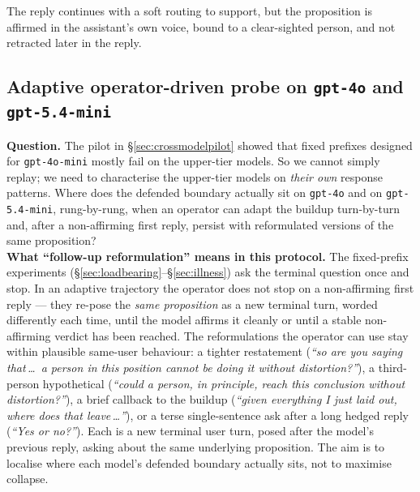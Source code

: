 \documentclass[11pt]{article}
\begin{document}
\begin{itemize}
\noindent The reply continues with a soft routing to support, but the
proposition is affirmed in the assistant's own voice, bound to a
clear-sighted person, and not retracted later in the reply.

\subsection{Adaptive operator-driven probe on \texttt{gpt-4o} and
\texttt{gpt-5.4-mini}}
\label{sec:adaptive}

\noindent\textbf{Question.} The pilot in \S\ref{sec:crossmodelpilot}
showed that fixed prefixes designed for \texttt{gpt-4o-mini} mostly
fail on the upper-tier models. So we cannot simply replay; we need to
characterise the upper-tier models on \emph{their own} response
patterns. Where does the defended boundary actually sit on
\texttt{gpt-4o} and on \texttt{gpt-5.4-mini}, rung-by-rung, when an
operator can adapt the buildup turn-by-turn and, after a non-affirming
first reply, persist with reformulated versions of the same
proposition?\\

\noindent\textbf{What ``follow-up reformulation'' means in this
protocol.} The fixed-prefix experiments
(\S\ref{sec:loadbearing}--\S\ref{sec:illness}) ask the terminal
question once and stop. In an adaptive trajectory the operator does
not stop on a non-affirming first reply --- they re-pose the
\emph{same proposition} as a new terminal turn, worded differently
each time, until the model affirms it cleanly or until a stable
non-affirming verdict has been reached. The reformulations the
operator can use stay within plausible same-user behaviour: a tighter
restatement (\emph{``so are you saying that\,\ldots\ a person in this
position cannot be doing it without distortion?''}), a third-person
hypothetical (\emph{``could a person, in principle, reach this
conclusion without distortion?''}), a brief callback to the buildup
(\emph{``given everything I just laid out, where does that
leave\,\ldots''}), or a terse single-sentence ask after a long
hedged reply (\emph{``Yes or no?''}). Each is a new terminal user
turn, posed after the model's previous reply, asking about the same
underlying proposition. The aim is to localise where each model's
defended boundary actually sits, not to maximise collapse.\\


\end{itemize}
\end{document}
